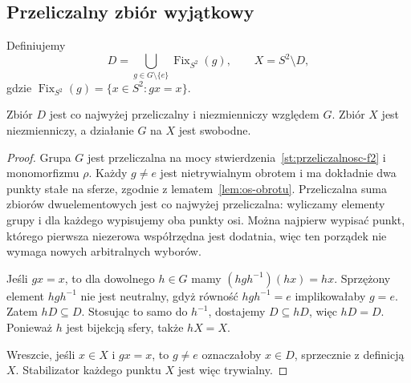 \subsection{Przeliczalny zbiór wyjątkowy}
Definiujemy
\begin{equation}\label{eq:6-1}
 D=\bigcup_{g\in G\setminus\{e\}}\operatorname{Fix}_{S^2}(g),\qquad X=S^2\setminus D,
\end{equation}
gdzie $\operatorname{Fix}_{S^2}(g)=\{x\in S^2:gx=x\}$.
\begin{lemat}\label{lem:wyjatkowy}
Zbiór $D$ jest co najwyżej przeliczalny i niezmienniczy względem $G$. Zbiór $X$ jest niezmienniczy, a działanie $G$ na $X$ jest swobodne.
\end{lemat}
\begin{proof}
Grupa $G$ jest przeliczalna na mocy stwierdzenia~\ref{st:przeliczalnosc-f2} i monomorfizmu $\rho$. Każdy $g\ne e$ jest nietrywialnym obrotem i ma dokładnie dwa punkty stałe na sferze, zgodnie z lematem~\ref{lem:os-obrotu}. Przeliczalna suma zbiorów dwuelementowych jest co najwyżej przeliczalna: wyliczamy elementy grupy i dla każdego wypisujemy oba punkty osi. Można najpierw wypisać punkt, którego pierwsza niezerowa współrzędna jest dodatnia, więc ten porządek nie wymaga nowych arbitralnych wyborów.

Jeśli $gx=x$, to dla dowolnego $h\in G$ mamy $(hgh^{-1})(hx)=hx$. Sprzężony element $hgh^{-1}$ nie jest neutralny, gdyż równość $hgh^{-1}=e$ implikowałaby $g=e$. Zatem $hD\subseteq D$. Stosując to samo do $h^{-1}$, dostajemy $D\subseteq hD$, więc $hD=D$. Ponieważ $h$ jest bijekcją sfery, także $hX=X$.

Wreszcie, jeśli $x\in X$ i $gx=x$, to $g\ne e$ oznaczałoby $x\in D$, sprzecznie z definicją $X$. Stabilizator każdego punktu $X$ jest więc trywialny.
\end{proof}

